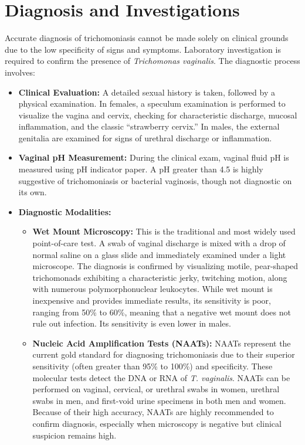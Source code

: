 \section*{Diagnosis and Investigations}
Accurate diagnosis of trichomoniasis cannot be made solely on clinical grounds due to the low specificity of signs and symptoms. Laboratory investigation is required to confirm the presence of \textit{Trichomonas vaginalis}. The diagnostic process involves:
\begin{itemize}
    \item \textbf{Clinical Evaluation:} A detailed sexual history is taken, followed by a physical examination. In females, a speculum examination is performed to visualize the vagina and cervix, checking for characteristic discharge, mucosal inflammation, and the classic ``strawberry cervix.'' In males, the external genitalia are examined for signs of urethral discharge or inflammation.
    \item \textbf{Vaginal pH Measurement:} During the clinical exam, vaginal fluid pH is measured using pH indicator paper. A pH greater than 4.5 is highly suggestive of trichomoniasis or bacterial vaginosis, though not diagnostic on its own.
    \item \textbf{Diagnostic Modalities:}
    \begin{itemize}
        \item \textbf{Wet Mount Microscopy:} This is the traditional and most widely used point-of-care test. A swab of vaginal discharge is mixed with a drop of normal saline on a glass slide and immediately examined under a light microscope. The diagnosis is confirmed by visualizing motile, pear-shaped trichomonads exhibiting a characteristic jerky, twitching motion, along with numerous polymorphonuclear leukocytes. While wet mount is inexpensive and provides immediate results, its sensitivity is poor, ranging from 50\% to 60\%, meaning that a negative wet mount does not rule out infection. Its sensitivity is even lower in males.
        \item \textbf{Nucleic Acid Amplification Tests (NAATs):} NAATs represent the current gold standard for diagnosing trichomoniasis due to their superior sensitivity (often greater than 95\% to 100\%) and specificity. These molecular tests detect the DNA or RNA of \textit{T. vaginalis}. NAATs can be performed on vaginal, cervical, or urethral swabs in women, urethral swabs in men, and first-void urine specimens in both men and women. Because of their high accuracy, NAATs are highly recommended to confirm diagnosis, especially when microscopy is negative but clinical suspicion remains high.

\end{itemize}
\end{itemize}
